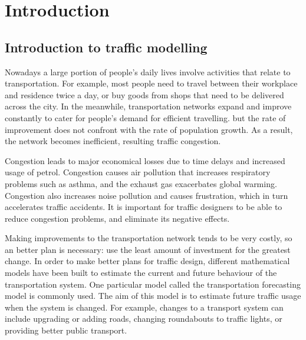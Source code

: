 \chapter{Introduction}


\section{Introduction to traffic modelling}
Nowadays a large portion of people's daily lives involve activities that relate to transportation.
For example, most people need to travel between their workplace and residence twice a day,
or buy goods from shops that need to be delivered across the city.
In the meanwhile, 
transportation networks expand and improve constantly to cater for people's demand for efficient travelling.
but the rate of improvement does not confront with the rate of population growth.
As a result,
the network becomes inefficient, resulting traffic congestion.

Congestion leads to major economical losses due to time delays and increased usage of petrol.
Congestion causes air pollution that increases respiratory problems such as asthma, 
and the exhaust gas exacerbates global warming.
Congestion also increases noise pollution and causes frustration,
which in turn accelerates traffic accidents.
It is important for traffic designers to be able to reduce congestion problems,
and eliminate its negative effects.

Making improvements to the transportation network tends to be very costly,
so an better plan is necessary:
use the least amount of investment for the greatest change.
In order to make better plans for traffic design,
different mathematical models have been built to estimate the current and future behaviour of the transportation system.
One particular model called the transportation forecasting model is commonly used.
The aim of this model is to estimate future traffic usage when the system is changed.
For example, changes to a transport system can include upgrading or adding roads, changing roundabouts to traffic lights, or providing better public transport. 

